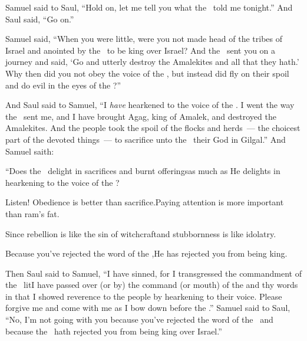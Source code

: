 \begin{inparaenum}
   Samuel said to Saul, ``Hold on, let me tell you what the \lord\ told me tonight.'' And Saul said, ``Go on.''%

   Samuel said, ``When you were little, were you not made head of the tribes of Israel and anointed by the \lord\ to be king over Israel?%
   And the \lord\ sent you on a journey and said, `Go and utterly destroy the Amalekites and all that they hath.'%
   Why then did you not obey the voice of the \lord, but instead did fly on their spoil and do evil in the eyes of the \lord?''%

   And Saul said to Samuel, ``I \emph{have} hearkened to the voice of the \lord. I went the way the \lord\ sent me, and I have brought Agag, king of Amalek, and destroyed the Amalekites.%
   And the people took the spoil of the flocks and herds~--- the choicest part of the devoted things~--- to sacrifice unto the \lord\ their God in Gilgal.''%
   And Samuel saith:%

  \pb{}``Does the \lord\ delight in sacrifices and burnt offerings\pa{}as much as He delights in hearkening to the voice of the \lord?%

  \pb{}Listen! Obedience is better than sacrifice.\pa{}Paying attention is more important than ram's fat.%

  \pa{} Since rebellion is like the sin of witchcraft\pa{}and stubbornness is like idolatry.%

  \pb{}Because you've rejected the word of the \lord,\pa{}He has rejected you from being king.%

   Then Saul said to Samuel, ``I have sinned, for I transgressed the commandment of the \lord\ lit{I have passed over (or by) the command (or mouth) of the \lord} and thy words in that I showed reverence to the people by hearkening to their voice.%
   Please forgive me and come with me as I bow down before the \lord.''%
   Samuel said to Saul, ``No, I'm not going with you because you've rejected the word of the \lord\ and because the \lord\ hath rejected you from being king over Israel.''%


\end{inparaenum}
